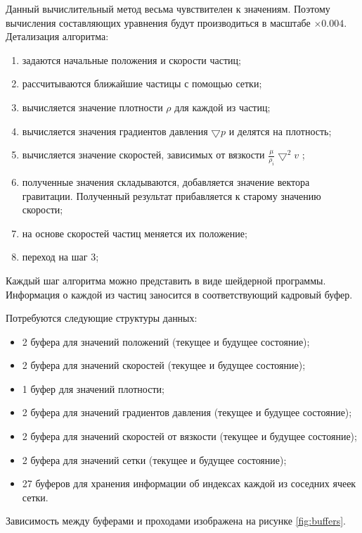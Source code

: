 Данный вычислительный метод весьма чувствителен к значениям. Поэтому вычисления составляющих
уравнения будут производиться в масштабе $\times0.004$. \\

Детализация алгоритма:

\begin{enumerate}
  \item задаются начальные положения и скорости частиц;
  \item рассчитываются ближайшие частицы с помощью сетки;
  \item вычисляется значение плотности $\rho$ для каждой из частиц;
  \item вычисляется значения градиентов давления $\bigtriangledown{}p$ и делятся на плотность;
  \item вычисляется значение скоростей, зависимых от вязкости $\frac{\mu}{\rho_i}\bigtriangledown^2v$ ;
  \item полученные значения складываются, добавляется значение вектора гравитации. Полученный
    результат прибавляется к старому значению скорости;
  \item на основе скоростей частиц меняется их положение;
  \item переход на шаг 3;
\end{enumerate}

Каждый шаг алгоритма можно представить в виде шейдерной программы. Информация о каждой из частиц 
заносится в соответствующий кадровый буфер. 

Потребуются следующие структуры данных:

\begin{itemize}
  \item 2 буфера для значений положений (текущее и будущее состояние);
  \item 2 буфера для значений скоростей (текущее и будущее состояние);
  \item 1 буфер для значений плотности;
  \item 2 буфера для значений градиентов давления (текущее и будущее состояние);
  \item 2 буфера для значений скоростей от вязкости (текущее и будущее состояние);
  \item 2 буфера для значений сетки (текущее и будущее состояние);
  \item 27 буферов для хранения информации об индексах каждой из соседних ячеек сетки.
\end{itemize}

Зависимость между буферами и проходами изображена на рисунке \ref{fig:buffers}.

